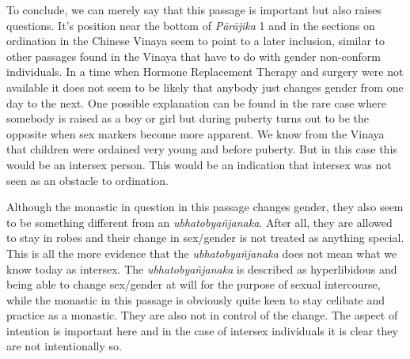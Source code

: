 To conclude, we can merely say that this passage is important but also raises questions. It's position near the bottom of {\em Pārājika} 1 and in the sections on ordination in the Chinese Vinaya seem to point to a later inclusion, similar to other passages found in the Vinaya that have to do with gender non-conform individuals. In a time when Hormone Replacement Therapy and surgery were not available it does not seem to be likely that anybody just changes gender from one day to the next. One possible explanation can be found in the rare case where somebody is raised as a boy or girl but during puberty turns out to be the opposite when sex markers become more apparent. We know from the Vinaya that children were ordained very young and before puberty. But in this case this would be an intersex person. This would be an indication that intersex was not seen as an obstacle to ordination.

Although the monastic in question in this passage changes gender, they also seem to be something different from an {\em ubhatob­yañ­janaka}. After all, they are allowed to stay in robes and their change in sex/gender is not treated as anything special. This is all the more evidence that the {\em ubhatob­yañ­janaka} does not mean what we know today as intersex. The {\em ubhatob­yañ­janaka} is described as hyperlibidous and being able to change sex/gender at will for the purpose of sexual intercourse, while the monastic in this passage is obviously quite keen to stay celibate and practice as a monastic. They are also not in control of the change. The aspect of intention is important here and in the case of intersex individuals it is clear they are not intentionally so.
